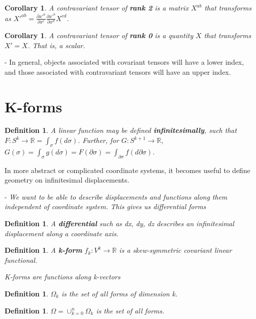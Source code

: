 \documentclass{book}
\newtheorem{defn}[equation]{Definition}
\newtheorem{coro}[equation]{Corollary}
\begin{document}
\begin{coro}
	A contravariant tensor of \textbf{rank 2} is a matrix $X^{ab}$ that transforms as $X'^{ab} = \frac{\partial x'^a}{\partial x^c} \frac{\partial x'^b}{\partial x^d} X^{cd}$. 
\end{coro}

\begin{coro}
	A contravariant tensor of \textbf{rank 0} is a quantity $X$ that transforms $X' = X$. That is, a scalar. 
\end{coro}

- In general, objects associated with covariant tensors will have a lower index, and those associated with contravariant tensors will have an upper index. 

\section{K-forms}




\begin{defn}
	A linear function may be defined \textbf{infinitesimally}, such that $F : S^k \to \mathbb{R} = \int_{\sigma} f(d\sigma)$. Further, for $G : S^{k+1} \to \mathbb{R}$, $G(\sigma) = \int_{\sigma} g(d\sigma) = F(\partial\sigma) = \int_{\partial\sigma}f(d\partial\sigma)$. 
\end{defn}

In more abstract or complicated coordinate systems, it becomes useful to define geometry on infinitesimal displacements. 

- \emph{We want to be able to describe displacements and functions along them independent of coordinate system. This gives us differential forms}


\begin{defn}
	A \textbf{differential} such as dx, dy, dz describes an infinitesimal displacement along a coordinate axis. 
\end{defn}

\begin{defn}
	A \textbf{k-form} $f_k : V^k \to \mathbb{R}$ is a skew-symmetric covariant linear functional. 
\end{defn}

\emph{K-forms are functions along k-vectors}

\begin{defn}
	$\Omega_k$ is the set of all forms of dimension k. 
\end{defn}

\begin{defn}
	$\Omega = \cup_{k=0}^n\Omega_k$ is the set of all forms. 
\end{defn}
\end{document}
